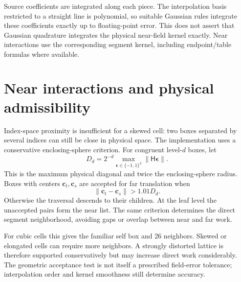 Source coefficients are integrated along each piece. The interpolation basis
restricted to a straight line is polynomial, so suitable Gaussian rules
integrate these coefficients exactly up to floating-point error. This does
not assert that Gaussian quadrature integrates the physical near-field kernel
exactly. Near interactions use the corresponding segment kernel, including
endpoint/table formulas where available.

\section{Near interactions and physical admissibility}
Index-space proximity is insufficient for a skewed cell: two boxes separated
by several indices can still be close in physical space. The implementation
uses a conservative enclosing-sphere criterion. For congruent level-$d$ boxes,
let
\begin{equation}
 D_d=2^{-d}\max_{\bm\epsilon\in\{-1,1\}^3}
          \|\mathsf H\bm\epsilon\|.
\end{equation}
This is the maximum physical diagonal and twice the enclosing-sphere radius.
Boxes with centers $\bm c_t,\bm c_s$ are accepted for far translation when
\begin{equation}
 \|\bm c_t-\bm c_s\|>1.01D_d.
 \label{eq:fmmAdmissibility}
\end{equation}
Otherwise the traversal descends to their children. At the leaf level the
unaccepted pairs form the near list. The same criterion determines the direct
segment neighborhood, avoiding gaps or overlap between near and far work.

For cubic cells this gives the familiar self box and 26 neighbors. Skewed or
elongated cells can require more neighbors. A strongly distorted lattice is
therefore supported conservatively but may increase direct work considerably.
The geometric acceptance test is not itself a prescribed field-error
 tolerance; interpolation order and kernel smoothness still determine accuracy.

